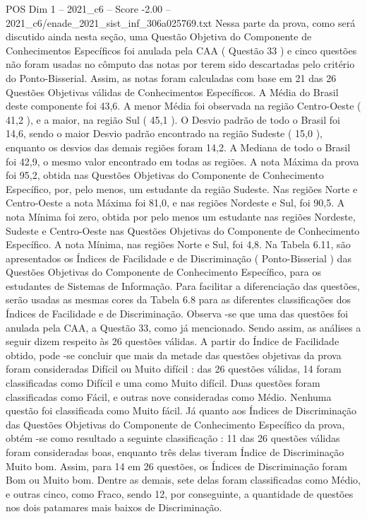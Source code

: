 \begin{textsample}{POS Dim 1 – 2021\_c6 – Score -2.00 – 2021\_c6/enade\_2021\_sist\_inf\_306a025769.txt}
Nessa parte da prova, como será discutido ainda nesta seção, uma Questão Objetiva do Componente de Conhecimentos Específicos foi anulada pela CAA ( Questão 33 ) e cinco questões não foram usadas no cômputo das notas por terem sido descartadas pelo critério do Ponto-Bisserial.
Assim, as notas foram calculadas com base em 21 das 26 Questões Objetivas válidas de Conhecimentos Específicos.
A Média do Brasil deste componente foi 43,6.
A menor Média foi observada na região Centro-Oeste ( 41,2 ), e a maior, na região Sul ( 45,1 ).
O Desvio padrão de todo o Brasil foi 14,6, sendo o maior Desvio padrão encontrado na região Sudeste ( 15,0 ), enquanto os desvios das demais regiões foram 14,2.
A Mediana de todo o Brasil foi 42,9, o mesmo valor encontrado em todas as regiões.
A nota Máxima da prova foi 95,2, obtida nas Questões Objetivas do Componente de Conhecimento Específico, por, pelo menos, um estudante da região Sudeste.
Nas regiões Norte e Centro-Oeste a nota Máxima foi 81,0, e nas regiões Nordeste e Sul, foi 90,5.
A nota Mínima foi zero, obtida por pelo menos um estudante nas regiões Nordeste, Sudeste e Centro-Oeste nas Questões Objetivas do Componente de Conhecimento Específico.
A nota Mínima, nas regiões Norte e Sul, foi 4,8.
Na Tabela 6.11, são apresentados os Índices de Facilidade e de Discriminação ( Ponto-Bisserial ) das Questões Objetivas do Componente de Conhecimento Específico, para os estudantes de Sistemas de Informação.
Para facilitar a diferenciação das questões, serão usadas as mesmas cores da Tabela 6.8 para as diferentes classificações dos Índices de Facilidade e de Discriminação.
Observa -se que uma das questões foi anulada pela CAA, a Questão 33, como já mencionado.
Sendo assim, as análises a seguir dizem respeito às 26 questões válidas.
A partir do Índice de Facilidade obtido, pode -se concluir que mais da metade das questões objetivas da prova foram consideradas Difícil ou Muito difícil : das 26 questões válidas, 14 foram classificadas como Difícil e uma como Muito difícil.
Duas questões foram classificadas como Fácil, e outras nove consideradas como Médio.
Nenhuma questão foi classificada como Muito fácil.
Já quanto aos Índices de Discriminação das Questões Objetivas do Componente de Conhecimento Específico da prova, obtém -se como resultado a seguinte classificação : 11 das 26 questões válidas foram consideradas boas, enquanto três delas tiveram Índice de Discriminação Muito bom.
Assim, para 14 em 26 questões, os Índices de Discriminação foram Bom ou Muito bom.
Dentre as demais, sete delas foram classificadas como Médio, e outras cinco, como Fraco, sendo 12, por conseguinte, a quantidade de questões nos dois patamares mais baixos de Discriminação.

\end{textsample}
